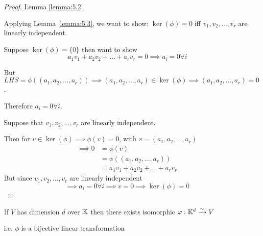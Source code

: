 \begin{proof} {Lemma \ref{lemma:5.2}}
    \hfill

    Applying Lemma \ref{lemma:5.3}, we want to show: \(\ker(\phi) = {0}\) iff \(v_1, v_2, \dots, v_r\) are linearly independent.

    \pffwd Suppose \(\ker(\phi) = \{0\}\) then want to show \[
        a_1v_1 + a_2v_2 + \dots + a_rv_r = 0 \implies a_i = 0 \forall i
    \]

    But \(LHS = \phi((a_1, a_2, \dots, a_r))  \implies (a_1, a_2, \dots, a_r) \in \ker(\phi) \implies (a_1, a_2, \dots, a_r)  = 0\).

    Therefore \(a_i = 0 \forall i\).

    \pfbwd Suppose that \(v_1, v_2, \dots, v_r\) are linearly independent.

    Then for \(v \in \ker(\phi) \implies \phi(v) = 0\), with \(v = (a_1, a_2, \dots, a_r)\)
    \begin{align*}
        \implies 0 & =\phi(v)                           \\
                   & = \phi((a_1, a_2, \dots, a_r))     \\
                   & = a_1v_1 + a_2v_2 + \dots + a_rv_r
    \end{align*}
    But since \(v_1, v_2, \dots, v_r\) are linearly independent
    \[
        \implies a_i = 0 \forall i \implies v = 0 \implies \ker(\phi) = {0}
    \]
\end{proof}

\begin{corollary}
    If \(V\) has dimension \(d\) over \(\mathbb{K}\) then there exists isomorphic \(\varphi: \mathbb{K}^d \xrightarrow{\sim} V\)

    i.e. \(\phi\) is a bijective linear transformation
\end{corollary}


